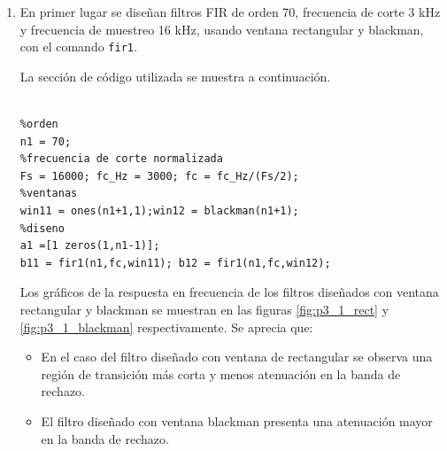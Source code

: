 \begin{enumerate}
\item En primer lugar se diseñan filtros FIR de orden 70, frecuencia de corte 3 kHz y frecuencia de muestreo 16 kHz, usando ventana rectangular y blackman, con el comando \texttt{fir1}.

La sección de código utilizada se muestra a continuación.
\begin{lstlisting}[frame=single]
%%% 1. Diseno de filtros FIR usando fir1

%orden
n1 = 70;
%frecuencia de corte normalizada
Fs = 16000; fc_Hz = 3000; fc = fc_Hz/(Fs/2);
%ventanas
win11 = ones(n1+1,1);win12 = blackman(n1+1);
%diseno
a1 =[1 zeros(1,n1-1)];
b11 = fir1(n1,fc,win11); b12 = fir1(n1,fc,win12);
\end{lstlisting}

Los gráficos de la respuesta en frecuencia de los filtros diseñados con ventana rectangular y blackman se muestran en las figuras \ref{fig:p3_1_rect} y \ref{fig:p3_1_blackman} respectivamente. Se aprecia que:
\begin{itemize}
    \item En el caso del filtro diseñado con ventana de rectangular se observa una región de transición más corta y menos atenuación en la banda de rechazo.
    \item El filtro diseñado con ventana blackman presenta una atenuación mayor en la banda de rechazo.
\end{itemize}


\end{enumerate}
